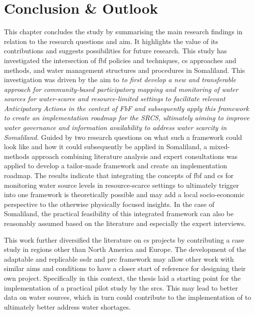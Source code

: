\chapter{Conclusion \& Outlook}

\label{chapter6}

This chapter concludes the study by summarising the main research findings in relation to the research questions and aim. It highlights the value of its contributions and suggests possibilities for future research.\newline
This study has investigated the intersection of \acrlong{fbf} policies and techniques, \acrlong{cs} approaches and methods, and water management structures and procedures in Somaliland. This investigation was driven by the aim to \textit{to first develop a new and transferable approach for community-based participatory mapping and monitoring of water sources for water-scarce and resource-limited settings to facilitate relevant Anticipatory Actions in the context of FbF and subsequently apply this framework to create an implementation roadmap for the SRCS, ultimately aiming to improve water governance and information availability to address water scarcity in Somaliland}.\newline
Guided by two research questions on what such a framework could look like and how it could subsequently be applied in Somaliland, a mixed-methods approach combining literature analysis and expert consultations was applied to develop a tailor-made framework and create an implementation roadmap. The results indicate that integrating the concepts of \acrlong{fbf} and \acrlong{cs} for monitoring water source levels in resource-scarce settings to ultimately trigger  into one framework is theoretically possible and may add a local socio-economic perspective to the otherwise physically focused insights. In the case of Somaliland, the practical feasibility of this integrated framework can also be reasonably assumed based on the literature and especially the expert interviews.\newline

This work further diversified the literature on \acrlong{cs} projects by contributing a case study in regions other than North America and Europe. The development of the adaptable and replicable \acrlong{ssdr} and \acrlong{prc} framework may allow other work with similar aims and conditions to have a closer start of reference for designing their own project. Specifically in this context, the thesis laid a starting point for the implementation of a practical pilot study by the \acrlong{srcs}. This may lead to better data on water sources, which in turn could contribute to the implementation of  to ultimately better address water shortages.\newline

